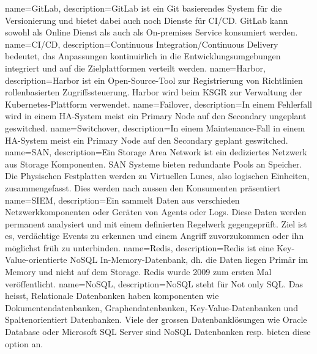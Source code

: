 {
        name=GitLab,
        description={GitLab ist ein \Gls{Git} basierendes System für die Versionierung und bietet dabei auch noch Dienste für CI/CD.
        GitLab kann sowohl als Online Dienst als auch als On-premises Service konsumiert werden\cite{MPSC6ELK}.}
}
{
        name=CI/CD,
        description={Continuous Integration/Continuous Delivery bedeutet,
        das Anpassungen kontinuirlich in die Entwicklungsumgebungen integriert und
        auf die Zielplattformen verteilt werden\cite{I65F7WAQ}.}
}
{
        name=Harbor,
        description={Harbor ist ein Open-Source-Tool zur Registrierung von Richtlinien rollenbasierten Zugriffssteuerung\cite{PV6GD72X}.
Harbor wird beim KSGR zur Verwaltung der \Gls{Kubernetes}-Plattform verwendet.}
}
{
        name=Failover,
        description={In einem Fehlerfall wird in einem HA-System meist ein Primary Node auf den Secondary ungeplant geswitched.}
}
{
        name=Switchover,
        description={In einem Maintenance-Fall in einem HA-System meist ein Primary Node auf den Secondary geplant geswitched.}
}
{
        name=SAN,
        description={Ein Storage Area Network ist ein dediziertes Netzwerk aus Storage Komponenten.
        SAN Systeme bieten redundante Pools an Speicher.
        Die Physischen Festplatten werden zu Virtuellen Lunes, also logischen Einheiten, zusammengefasst.
        Dies werden nach aussen den Konsumenten präsentiert\cite{ZRRXBFRA,7ZTCYW5G,JWVC9B7L}}
}
{
        name=SIEM,
        description={Ein sammelt Daten aus verschieden Netzwerkkomponenten oder Geräten von Agents oder Logs.
        Diese Daten werden permanent analysiert und mit einem definierten Regelwerk gegengeprüft.
        Ziel ist es, verdächtige Events zu erkennen und einem Angriff zuvorzukommen oder ihn möglichst früh zu unterbinden\cite{78JPTB5R}.}
}
{
        name=Redis,
        description={Redis ist eine Key-Value-orientierte \Gls{NoSQL} In-Memory-Datenbank, dh.
        die Daten liegen Primär im Memory und nicht auf dem Storage\cite{57XLMIRR}.
Redis wurde 2009 zum ersten Mal veröffentlicht.}
}
{
        name=NoSQL,
        description={NoSQL steht für Not only SQL. Das heisst, Relationale Datenbanken haben komponenten wie Dokumentendatenbanken,
Graphendatenbanken, Key-Value-Datenbanken und Spaltenorientiert Datenbanken.
Viele der grossen Datenbanklösungen wie \Gls{Oracle Database} oder \Gls{Microsoft SQL Server} sind NoSQL Datenbanken resp.
bieten diese option an.}
}
